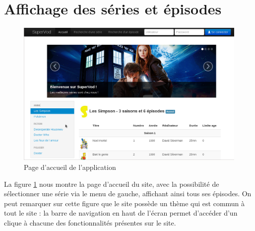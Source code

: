\documentclass[12pt,a4paper,openany]{book}
\begin{document}
	\section{Affichage des séries et épisodes}
	\begin{figure}[H]
		\includegraphics[width=18.0cm]{screens/accueil.png}
		\caption{Page d'accueil de l'application}
		\label{fig:accueil}
	\end{figure}
	La figure \ref{fig:accueil} nous montre la page d'accueil du site, avec la possibilité de sélectionner une série via le menu de gauche, affichant ainsi tous
	ses épisodes. On peut remarquer sur cette figure que le site possède un thème qui est commun à tout le site : la barre de navigation en haut de l'écran
	permet d'accéder d'un clique à chacune des fonctionnalités présentes sur le site.
\end{document}
